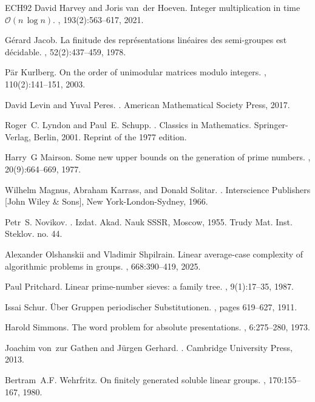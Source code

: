\documentclass{article}
\theoremstyle{plain}
\theoremstyle{definition}
\begin{document}
\begin{thebibliography}{ECH{\etalchar{+}}92}
David Harvey and Joris van~der Hoeven.
\newblock Integer multiplication in time $\mathcal{O}(n\, \log n)$.
, 193(2):563--617, 2021.

Gérard Jacob.
\newblock La finitude des représentations linéaires des semi-groupes est
  décidable.
, 52(2):437--459, 1978.

Pär Kurlberg.
\newblock On the order of unimodular matrices modulo integers.
, 110(2):141--151, 2003.

David Levin and Yuval Peres.
.
\newblock American Mathematical Society Press, 2017.

Roger~C. Lyndon and Paul~E. Schupp.
.
\newblock Classics in Mathematics. Springer-Verlag, Berlin, 2001.
\newblock Reprint of the 1977 edition.

Harry~G Mairson.
\newblock Some new upper bounds on the generation of prime numbers.
, 20(9):664--669, 1977.

Wilhelm Magnus, Abraham Karrass, and Donald Solitar.
.
\newblock Interscience Publishers [John Wiley \& Sons], New York-London-Sydney,
  1966.

Petr~S. Novikov.
.
\newblock Izdat. Akad. Nauk SSSR, Moscow, 1955.
\newblock Trudy Mat. Inst. Steklov. no. 44.

Alexander Olshanskii and Vladimir Shpilrain.
\newblock Linear average-case complexity of algorithmic problems in groups.
, 668:390--419, 2025.

Paul Pritchard.
\newblock Linear prime-number sieves: a family tree.
, 9(1):17--35, 1987.

Issai Schur.
\newblock Über {G}ruppen periodischer {S}ubstitutionen.
, pages 619--627, 1911.

Harold Simmons.
\newblock The word problem for absolute presentations.
, 6:275--280, 1973.

Joachim von~zur Gathen and Jürgen Gerhard.
.
\newblock Cambridge University Press, 2013.

Bertram~A.F. Wehrfritz.
\newblock On finitely generated soluble linear groups.
, 170:155--167, 1980.

\end{thebibliography}
\end{document}
